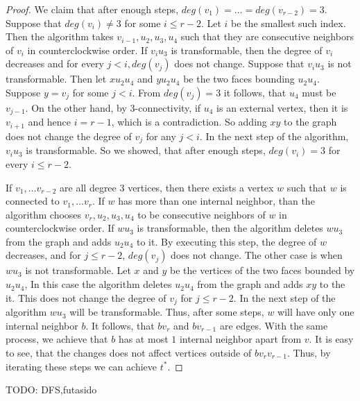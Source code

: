 \begin{proof}
  We claim that after enough steps, $deg(v_1) = \dots = deg(v_{r - 2}) = 3$.
  Suppose that $deg(v_i) \neq 3$ for some $i \le r - 2$. Let $i$ be the smallest such index.
  Then the algorithm takes $v_{i - 1}, u_2, u_3, u_4$ such that they are consecutive neighbors of $v_i$
  in counterclockwise order. If $v_iu_3$ is transformable, then the degree of $v_i$
  decreases and for every $j < i, deg(v_j)$ does not change. Suppose that $v_iu_3$
  is not transformable. Then let $xu_2u_4$ and $yu_2u_4$ be the two faces bounding $u_2u_4$.
  Suppose $y = v_j$ for some $j < i$. From $deg(v_j) = 3$ it follows, that $u_4$ must be $v_{j - 1}$.
  On the other hand, by $3$-connectivity, if $u_4$ is an external vertex, then it
  is $v_{i + 1}$ and hence $i = r - 1$, which is a contradiction. So adding $xy$ to the graph
  does not change the degree of $v_j$ for any $j < i$. In the next step of the algorithm,
  $v_iu_3$ is transformable. So we showed, that after enough steps, $deg(v_i) = 3$ for every $i \le r - 2$.

  If $v_1, \dots v_{r - 2}$ are all degree $3$ vertices, then there exists a vertex $w$
  such that $w$ is connected to $v_1, \dots v_r$. If $w$ has
  more than one internal neighbor, than the algorithm chooses $v_r, u_2, u_3, u_4$ to
  be consecutive neighbors of $w$ in counterclockwise order. If $wu_3$ is transformable,
  then the algorithm deletes $wu_3$ from the graph and adds $u_2u_4$ to it. By executing this step,
  the degree of $w$ decreases, and for $j \le r - 2$, $deg(v_j)$ does not change.
  The other case is when $wu_3$ is not transformable. Let $x$ and $y$ be the
  vertices of the two faces bounded by $u_2u_4$, In this case the algorithm
  deletes $u_2u_4$ from the graph and adds $xy$ to the it. This does not change the
  degree of $v_j$ for $j \le r - 2$. In the next step of the algorithm $wu_3$ will be
  transformable. Thus, after some steps, $w$ will have only one internal neighbor $b$.
  It follows, that $bv_r$ and $bv_{r - 1}$ are edges. With the same process, we
  achieve that $b$ has at most $1$ internal neighbor apart from $v$. It is easy to see, that
  the changes does not affect vertices outside of $bv_rv_{r - 1}$. Thus, by iterating these
  steps we can achieve $t^*$.
\end{proof}

TODO: DFS,futasido
